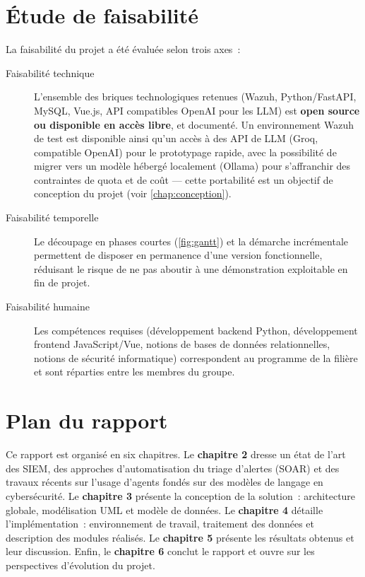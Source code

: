 \section{Étude de faisabilité}

La faisabilité du projet a été évaluée selon trois axes~:

\begin{description}
  \item[Faisabilité technique] L'ensemble des briques technologiques
    retenues (Wazuh, Python/FastAPI, MySQL, Vue.js, API compatibles
    OpenAI pour les LLM) est \textbf{open source ou disponible en accès
    libre}, et documenté. Un environnement Wazuh de test est disponible ainsi
    qu'un accès à des API de LLM (Groq, compatible OpenAI) pour le
    prototypage rapide, avec la possibilité de migrer vers un modèle
    hébergé localement (Ollama) pour s'affranchir des contraintes de quota
    et de coût — cette portabilité est un objectif de conception du projet
    (voir \cref{chap:conception}).
  \item[Faisabilité temporelle] Le découpage en phases courtes
    (\cref{fig:gantt}) et la démarche incrémentale permettent de disposer
    en permanence d'une version fonctionnelle, réduisant le risque de ne
    pas aboutir à une démonstration exploitable en fin de projet.
  \item[Faisabilité humaine] Les compétences requises (développement
    backend Python, développement frontend JavaScript/Vue, notions de
    bases de données relationnelles, notions de sécurité informatique)
    correspondent au programme de la filière et sont réparties entre les
    membres du groupe.
\end{description}

\section{Plan du rapport}

Ce rapport est organisé en six chapitres. Le \textbf{chapitre 2} dresse un
état de l'art des SIEM, des approches d'automatisation du triage d'alertes
(SOAR) et des travaux récents sur l'usage d'agents fondés sur des modèles de
langage en cybersécurité. Le \textbf{chapitre 3} présente la conception de la
solution~: architecture globale, modélisation UML et modèle de données. Le
\textbf{chapitre 4} détaille l'implémentation~: environnement de travail,
traitement des données et description des modules réalisés. Le
\textbf{chapitre 5} présente les résultats obtenus et leur discussion.
Enfin, le \textbf{chapitre 6} conclut le rapport et ouvre sur les
perspectives d'évolution du projet.
